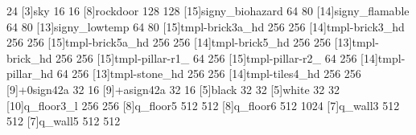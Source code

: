 24
[3]sky 16 16
[8]rockdoor 128 128
[15]signy_biohazard 64 80
[14]signy_flamable 64 80
[13]signy_lowtemp 64 80
[15]tmpl-brick3a_hd 256 256
[14]tmpl-brick3_hd 256 256
[15]tmpl-brick5a_hd 256 256
[14]tmpl-brick5_hd 256 256
[13]tmpl-brick_hd 256 256
[15]tmpl-pillar-r1_ 64 256
[15]tmpl-pillar-r2_ 64 256
[14]tmpl-pillar_hd 64 256
[13]tmpl-stone_hd 256 256
[14]tmpl-tiles4_hd 256 256
[9]+0sign42a 32 16
[9]+asign42a 32 16
[5]black 32 32
[5]white 32 32
[10]q_floor3_l 256 256
[8]q_floor5 512 512
[8]q_floor6 512 1024
[7]q_wall3 512 512
[7]q_wall5 512 512

